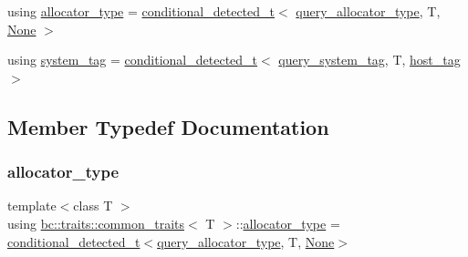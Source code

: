 \begin{DoxyCompactItemize}
\item 
using \hyperlink{structbc_1_1traits_1_1common__traits_af4d9ac2b53be674f74c465c2c09ac332}{allocator\+\_\+type} = \hyperlink{namespacebc_1_1traits_a1a6d378947ec32acd457890854bcd592}{conditional\+\_\+detected\+\_\+t}$<$ \hyperlink{namespacebc_1_1traits_ab141f0cc8348b4b7ebcb48e6bbb50d09}{query\+\_\+allocator\+\_\+type}, T, \hyperlink{classbc_1_1traits_1_1None}{None} $>$
\item 
using \hyperlink{structbc_1_1traits_1_1common__traits_a630fda1311989a031781f6e228dc0523}{system\+\_\+tag} = \hyperlink{namespacebc_1_1traits_a1a6d378947ec32acd457890854bcd592}{conditional\+\_\+detected\+\_\+t}$<$ \hyperlink{namespacebc_1_1traits_acfa34d40f06d5122586d7adefdfeb42f}{query\+\_\+system\+\_\+tag}, T, \hyperlink{structbc_1_1host__tag}{host\+\_\+tag} $>$
\end{DoxyCompactItemize}


\subsection{Member Typedef Documentation}
\mbox{\label{structbc_1_1traits_1_1common__traits_af4d9ac2b53be674f74c465c2c09ac332}} 
\subsubsection{\texorpdfstring{allocator\+\_\+type}{allocator\_type}}
{\footnotesize\ttfamily template$<$class T $>$ \\
using \hyperlink{structbc_1_1traits_1_1common__traits}{bc\+::traits\+::common\+\_\+traits}$<$ T $>$\+::\hyperlink{structbc_1_1traits_1_1common__traits_af4d9ac2b53be674f74c465c2c09ac332}{allocator\+\_\+type} =  \hyperlink{namespacebc_1_1traits_a1a6d378947ec32acd457890854bcd592}{conditional\+\_\+detected\+\_\+t}$<$\hyperlink{namespacebc_1_1traits_ab141f0cc8348b4b7ebcb48e6bbb50d09}{query\+\_\+allocator\+\_\+type}, T, \hyperlink{classbc_1_1traits_1_1None}{None}$>$}

\mbox{\label{structbc_1_1traits_1_1common__traits_a34ec53adbbda52eb2f30cb3ea1e07aac}} 
